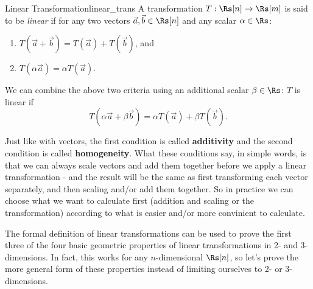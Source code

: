 \begin{definition}{Linear Transformation}{linear_trans}
	A transformation $T:\Rs[n]\to\Rs[m]$ is said to be \textit{linear} if for any two vectors $\vec{a},\vec{b}\in\Rs[n]$ and any scalar $\alpha\in\Rs$:
	\begin{enumerate}
		\item $T\left(\vec{a}+\vec{b}\right) = T(\vec{a})+T(\vec{b})$, and
		\item $T\left(\alpha \vec{a}\right) = \alpha T(\vec{a})$.
	\end{enumerate}

	We can combine the above two criteria using an additional scalar $\beta\in\Rs$: $T$ is linear if $$ T(\alpha\vec{a} + \beta\vec{b}) = \alpha T(\vec{a}) + \beta T(\vec{b}).$$
\end{definition}

Just like with vectors, the first condition is called \textbf{additivity} and the second condition is called \textbf{homogeneity}. What these conditions say, in simple words, is that we can always scale vectors and add them together before we apply a linear transformation - and the result will be the same as first transforming each vector separately, and then scaling and/or add them together. So in practice we can choose what we want to calculate first (addition and scaling or the transformation) according to what is easier and/or more convinient to calculate.

The formal definition of linear transformations can be used to prove the first three of the four basic geometric properties of linear transformations in 2- and 3-dimensions. In fact, this works for any $n$-dimensional  $\Rs[n]$, so let's prove the more general form of these properties instead of limiting ourselves to 2- or 3-dimensions.

